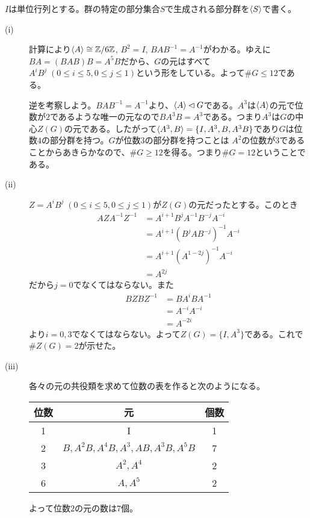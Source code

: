 \begin{sol} $I$は単位行列とする。群の特定の部分集合$S$で生成される部分群を$\langle S \rangle$で書く。
  \begin{description}
    \item[(i)] 計算により$\langle A \rangle \cong {\mathbb Z} / 6 {\mathbb Z}$, $B^2 = I$, $BAB^{-1} = A^{-1}$がわかる。ゆえに$BA = (BAB)B = A^5 B$だから、$G$の元はすべて$A^i B^j \; (0 \leq i \leq 5, 0\leq j \leq 1)$という形をしている。よって$\# G \leq 12$である。

    逆を考察しよう。$BAB^{-1} = A^{-1}$より、$\langle A \rangle \lhd G$である。$A^3$は$\langle A \rangle$の元で位数が$2$であるような唯一の元なので$BA^3B = A^3$である。つまり$A^3$は$G$の中心$Z(G)$の元である。したがって$\langle A^3, B \rangle = \{ I, A^3, B , A^3B\}$であり$G$は位数$4$の部分群を持つ。$G$が位数$3$の部分群を持つことは
    $A^2$の位数が$3$であることからあきらかなので、$\# G \geq 12$を得る。つまり$\# G =12$ということである。
    \item[(ii)] $Z = A^i B^j \; (0 \leq i \leq 5, 0\leq j \leq 1)$が$Z(G)$の元だったとする。このとき
    \begin{align*}
      AZA^{-1}Z^{-1} &= A^{i+1} B^j A^{-1} B^{-j} A^{-i} \\
      &= A^{i+1} (B^j A B^{-j})^{-1} A^{-i} \\
      &= A^{i+1} (A^{1-2j})^{-1} A^{-i} \\
      &= A^{2j}
    \end{align*}
    だから$j=0$でなくてはならない。また
    \begin{align*}
      BZBZ^{-1} &= BA^i B A^{-1} \\
      &= A^{-i } A^{-i} \\
      &= A^{-2i}
    \end{align*}
    より$i=0,3$でなくてはならない。よって$Z(G)= \{ I, A^3 \}$である。これで$\# Z(G)=2$が示せた。
    \item[(iii)] 各々の元の共役類を求めて位数の表を作ると次のようになる。
    \begin{center}
    \begin{tabular}{ccc}
     \hline
  位数 & 元 & 個数 \\
     \hline \hline
     1 & I & 1 \\
     2 & $B,A^2B, A^4B, A^3, AB, A^3B, A^5B$ &  7 \\
    3 & $A^2, A^4$ &  2  \\
    6 & $A, A^5$ & 2
     \end{tabular}
    \end{center}
    よって位数$2$の元の数は$7$個。
  \end{description}
\end{sol}
\newpage


